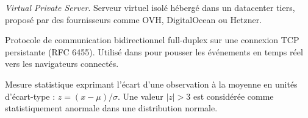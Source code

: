 \begin{description}[leftmargin=3.5cm, style=nextline, font=\bfseries\color{NavyBlue}]
  \item[VPS]
    \textit{Virtual Private Server}. Serveur virtuel isolé hébergé dans un
    datacenter tiers, proposé par des fournisseurs comme OVH, DigitalOcean
    ou Hetzner.

  \item[WebSocket]
    Protocole de communication bidirectionnel full-duplex sur une connexion TCP
    persistante (RFC 6455). Utilisé dans \caimp{} pour pousser les événements
    en temps réel vers les navigateurs connectés.

  \item[Z-score]
    Mesure statistique exprimant l'écart d'une observation à la moyenne en
    unités d'écart-type :
    $z = (x - \mu) / \sigma$. Une valeur $|z| > 3$ est considérée comme
    statistiquement anormale dans une distribution normale.

\end{description}
